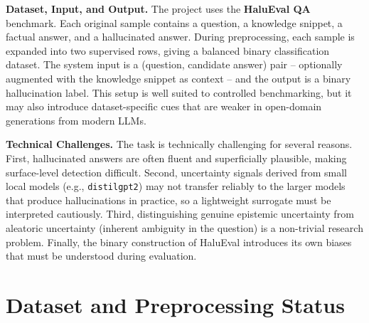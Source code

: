 \documentclass[12pt,a4paper]{article}
\begin{document}
\textbf{Dataset, Input, and Output.}
The project uses the \textbf{HaluEval QA} benchmark. Each original sample contains a question, a knowledge snippet, a factual answer, and a hallucinated answer. During preprocessing, each sample is expanded into two supervised rows, giving a balanced binary classification dataset. The system input is a (question, candidate answer) pair -- optionally augmented with the knowledge snippet as context -- and the output is a binary hallucination label. This setup is well suited to controlled benchmarking, but it may also introduce dataset-specific cues that are weaker in open-domain generations from modern LLMs.

\textbf{Technical Challenges.}
The task is technically challenging for several reasons. First, hallucinated answers are often fluent and superficially plausible, making surface-level detection difficult. Second, uncertainty signals derived from small local models (e.g., \texttt{distilgpt2}) may not transfer reliably to the larger models that produce hallucinations in practice, so a lightweight surrogate must be interpreted cautiously. Third, distinguishing genuine epistemic uncertainty from aleatoric uncertainty (inherent ambiguity in the question) is a non-trivial research problem. Finally, the binary construction of HaluEval introduces its own biases that must be understood during evaluation.

\section{Dataset and Preprocessing Status}
\end{document}
